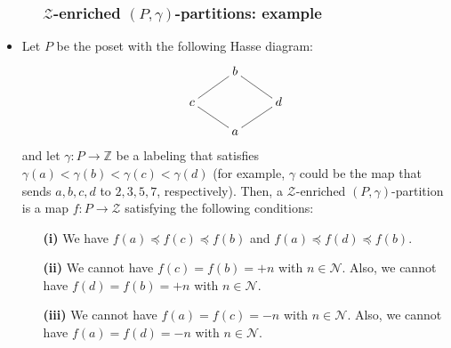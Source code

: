 \documentclass{beamer}
\makeatletter
\newcommand{\calZ}{\mathcal{Z}}
\newcommand{\fti}[1]{\frametitle{\ \ \ \ \ #1}}
\newcommand{\are}{\ar@{-}}
\newcommand{\tup}[1]{\left( #1 \right)}
\theoremstyle{plain}
\makeatother
\begin{document}
\begin{frame}
\fti{$\calZ$-enriched $\tup{P,\gamma}$-partitions: example}

\begin{itemize}

\item Let $P$ be the poset with the following Hasse
diagram:%
\[
\xymatrix@R=1pc{
& b \are[dl] \are[dr] \\
c \are[dr] & & d \are[dl] \\
& a
}%
\]
and let $\gamma:P\rightarrow\mathbb{Z}$ be a labeling that satisfies
$\gamma\left(  a\right)  <\gamma\left(  b\right)  <\gamma\left(  c\right)
<\gamma\left(  d\right)  $ (for example, $\gamma$ could be the map that sends
$a,b,c,d$ to $2,3,5,7$, respectively). Then, a $\mathcal{Z}$-enriched $\left(
P,\gamma\right)  $-partition is a map $f:P\rightarrow\mathcal{Z}$ satisfying
the following conditions:

\begin{enumerate}
\item[\textbf{(i)}] We have $f\left(  a\right)  \preccurlyeq f\left(
c\right)  \preccurlyeq f\left(  b\right)  $ and $f\left(  a\right)
\preccurlyeq f\left(  d\right)  \preccurlyeq f\left(  b\right)  $.

\item[\textbf{(ii)}] We cannot have $f\left(  c\right)  =f\left(  b\right)
=+n$ with $n\in\mathcal{N}$. Also, we cannot have $f\left(  d\right)
=f\left(  b\right)  =+n$ with $n\in\mathcal{N}$.

\item[\textbf{(iii)}] We cannot have $f\left(  a\right)  =f\left(  c\right)
=-n$ with $n\in\mathcal{N}$. Also, we cannot have $f\left(  a\right)
=f\left(  d\right)  =-n$ with $n\in\mathcal{N}$.
\end{enumerate}


\end{itemize}

\end{frame}
\end{document}
